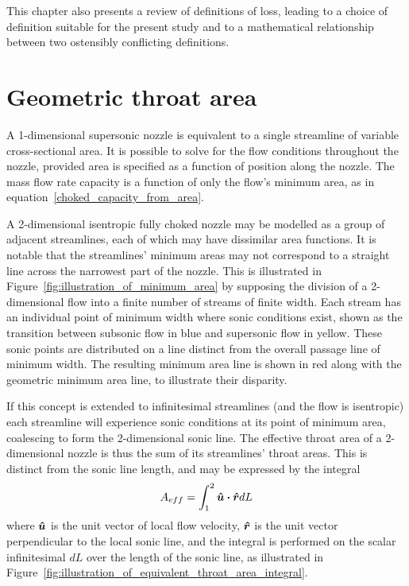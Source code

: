 \documentclass[a4paper, 11pt, oneside]{report}
\begin{document}
This chapter also presents a review of definitions of loss, leading to a choice of definition suitable for the present study and to a mathematical relationship between two ostensibly conflicting definitions.



\chapter{Geometric throat area}
\label{chapter_geometric_throat_area}

A 1-dimensional supersonic nozzle is equivalent to a single streamline of variable cross-sectional area. It is possible to solve for the flow conditions throughout the nozzle, provided area is specified as a function of position along the nozzle. The mass flow rate capacity is a function of only the flow's minimum area, as in equation~\ref{choked_capacity_from_area}.

A 2-dimensional isentropic fully choked nozzle may be modelled as a group of adjacent streamlines, each of which may have dissimilar area functions. It is notable that the streamlines' minimum areas may not correspond to a straight line across the narrowest part of the nozzle. This is illustrated in Figure~\ref{fig:illustration_of_minimum_area} by supposing the division of a 2-dimensional flow into a finite number of streams of finite width. Each stream has an individual point of minimum width where sonic conditions exist, shown as the transition between subsonic flow in blue and supersonic flow in yellow. These sonic points are distributed on a line distinct from the overall passage line of minimum width. The resulting minimum area line is shown in red along with the geometric minimum area line, to illustrate their disparity.

If this concept is extended to infinitesimal streamlines (and the flow is isentropic) each streamline will experience sonic conditions at its point of minimum area, coalescing to form the 2-dimensional sonic line. The effective throat area of a 2-dimensional nozzle is thus the sum of its streamlines' throat areas. This is distinct from the sonic line length, and may be expressed by the integral
\begin{equation}\label{effective_throat_area_integral}
	A_{eff} = 
	\int_{1}^2 \vu*{u} \vdot \vu*{r} dL
\end{equation}
where $\vu*{u}$ is the unit vector of local flow velocity, $\vu*{r}$ is the unit vector perpendicular to the local sonic line, and the integral is performed on the scalar infinitesimal $dL$ over the length of the sonic line, as illustrated in Figure~\ref{fig:illustration_of_equivalent_throat_area_integral}.
 		
\end{document}
